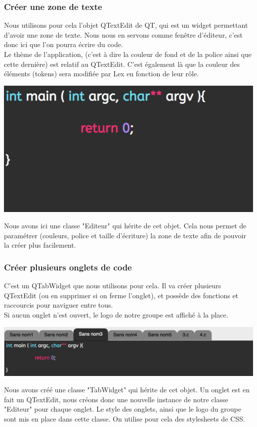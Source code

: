 \documentclass[a4paper,12pt]{article}
\begin{document}
			\subsubsection*{Créer une zone de texte}
			 Nous utilisons pour cela l'objet QTextEdit de QT, qui est un widget permettant d'avoir une zone de texte. Nous nous en servons comme fenêtre d'éditeur, c'est donc ici que l'on pourra écrire du code.\\
			Le thème de l'application, (c'est à dire la couleur de fond et de la police ainsi que cette dernière) est relatif au QTextEdit. C'est également là que la couleur des éléments (tokens) sera modifiée par Lex en fonction de leur rôle.\\
			\begin{center}
				\includegraphics[scale=1]{images/QTextEdit}
				\vspace{0.5cm}
			\end{center}
			Nous avons ici une classe "Editeur" qui hérite de cet objet. Cela nous permet de paramétrer (couleurs, police et taille d'écriture) la zone de texte afin de pouvoir la créer plus facilement.\\
			
			
			\subsubsection*{Créer plusieurs onglets de code}
			 C'est un QTabWidget que nous utilisons pour cela. Il va créer plusieurs QTextEdit (ou en supprimer si on ferme l'onglet), et possède des fonctions et raccourcis pour naviguer entre tous. \\
			Si aucun onglet n'est ouvert, le logo de notre groupe est affiché à la place.\\
			\begin{center}
				\includegraphics[scale=0.6]{images/QTabWidget}
				\vspace{0.5cm}
			\end{center}
			Nous avons créé une classe "TabWidget" qui hérite de cet objet. Un onglet est en fait un QTextEdit, nous créons donc une nouvelle instance de notre classe "Editeur" pour chaque onglet. Le style des onglets, ainsi que le logo du groupe sont mis en place dans cette classe. On utilise pour cela des stylesheets de CSS.\\
			
\end{document}
